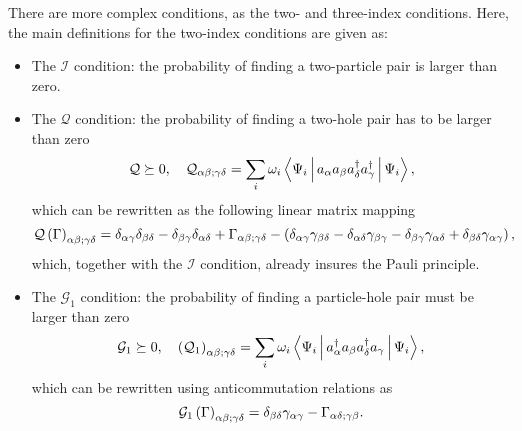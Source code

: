There are more complex conditions, as the two- and three-index conditions.
Here, the main definitions for the two-index conditions
are given as:
\begin{itemize}
    \item The $\mathcal{I}$ condition: the probability of finding a 
        two-particle pair is larger than zero.

    \item The $\mathcal{Q}$ condition: the probability of finding a two-hole
        pair has to be larger than zero 
        \begin{equation}
            \mathcal{Q} \succeq 0, \quad
            \mathcal{Q}_{\alpha \beta;\gamma \delta} =
            \sum_{i} \omega_i 
            \Braket{\Psi_i | a_{\alpha} a_{\beta} 
            a_{\delta}^{\dagger} a_{\gamma}^{\dagger} | \Psi_i},
        \end{equation}
        which can be rewritten as the following linear matrix mapping 
        \begin{equation}
            \mathcal{Q}\left( \Gamma \right)_{\alpha\beta;\gamma\delta} =
            \delta_{\alpha\gamma}\delta_{\beta\delta} - 
            \delta_{\beta\gamma}\delta_{\alpha\delta} + 
            \Gamma_{\alpha\beta;\gamma\delta} - 
            \left(
                \delta_{\alpha\gamma}\gamma_{\beta\delta} - 
                \delta_{\alpha\delta}\gamma_{\beta\gamma} - 
                \delta_{\beta\gamma}\gamma_{\alpha\delta} + 
                \delta_{\beta\delta}\gamma_{\alpha\gamma}
            \right)
            ,
        \end{equation}
        which, together with the $\mathcal{I}$ condition, already insures the 
        Pauli principle.

    \item The $\mathcal{G}_1$ condition: the probability of finding a 
        particle-hole pair must be larger than zero
        \begin{equation}
            \mathcal{G}_1 \succeq 0, \quad
            \left( \mathcal{Q}_1 \right)_{\alpha \beta;\gamma \delta} =
            \sum_{i} \omega_i 
            \Braket{\Psi_i | a_{\alpha}^{\dagger} a_{\beta} 
            a_{\delta}^{\dagger} a_{\gamma} | \Psi_i},
        \end{equation}
        which can be rewritten using anticommutation relations as
        \begin{equation}
            \mathcal{G}_1\left( \Gamma \right)_{\alpha\beta;\gamma\delta} =
            \delta_{\beta \delta} \gamma_{\alpha \gamma} - \Gamma_{\alpha \delta ; \gamma \beta}
            .
        \end{equation}


\end{itemize}
